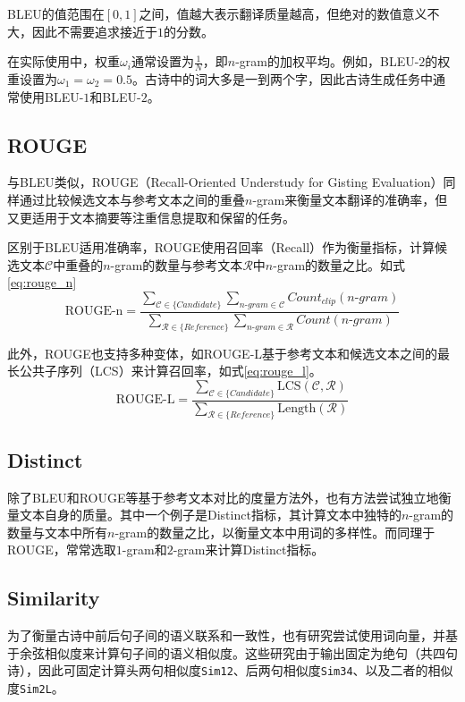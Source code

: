 BLEU的值范围在$[0,1]$之间，值越大表示翻译质量越高，但绝对的数值意义不大，因此不需要追求接近于$1$的分数。

在实际使用中，权重$\omega_i$通常设置为$\frac{1}{N}$，即$n$-gram的加权平均。例如，BLEU-$2$的权重设置为$\omega_1=\omega_2=0.5$。古诗中的词大多是一到两个字，因此古诗生成任务中通常使用BLEU-$1$和BLEU-$2$。

\subsection{ROUGE} \label{sec:rouge}
与BLEU类似，ROUGE（Recall-Oriented Understudy for Gisting Evaluation）同样通过比较候选文本与参考文本之间的重叠$n$-gram来衡量文本翻译的准确率，但又更适用于文本摘要等注重信息提取和保留的任务。

区别于BLEU适用准确率，ROUGE使用召回率（Recall）作为衡量指标，计算候选文本$\mathcal C$中重叠的$n$-gram的数量与参考文本$\mathcal R$中$n$-gram的数量之比。如式\eqref{eq:rouge_n}
\begin{equation}
    \text{ROUGE-n} = \frac{\sum_{\mathcal C \in\{Candidate\}} \sum_{n\mbox{-}gram\in\mathcal C} Count_{clip}(n\mbox{-}gram)}{\sum_{\mathcal R \in\{Reference\}} \sum_{n\mbox{-}gram\in\mathcal R} Count(n\mbox{-}gram)} \label{eq:rouge_n}
\end{equation}

此外，ROUGE也支持多种变体，如ROUGE-L基于参考文本和候选文本之间的最长公共子序列（LCS）来计算召回率，如式\eqref{eq:rouge_l}。
\begin{equation}
    \text{ROUGE-L} = \frac{\sum_{\mathcal C \in\{Candidate\}} \text{LCS}(\mathcal C,\mathcal R)}{\sum_{\mathcal R \in\{Reference\}}\text{Length}(\mathcal R)} \label{eq:rouge_l}
\end{equation}

\subsection{Distinct}
除了BLEU和ROUGE等基于参考文本对比的度量方法外，也有方法尝试独立地衡量文本自身的质量。其中一个例子是Distinct指标，其计算文本中独特的$n$-gram的数量与文本中所有$n$-gram的数量之比，以衡量文本中用词的多样性。而同理于ROUGE，常常选取$1$-gram和$2$-gram来计算Distinct指标。

\subsection{Similarity}
为了衡量古诗中前后句子间的语义联系和一致性，也有研究尝试使用词向量，并基于余弦相似度来计算句子间的语义相似度。这些研究由于输出固定为绝句（共四句诗），因此可固定计算头两句相似度\verb|Sim12|、后两句相似度\verb|Sim34|、以及二者的相似度\verb|Sim2L|。

